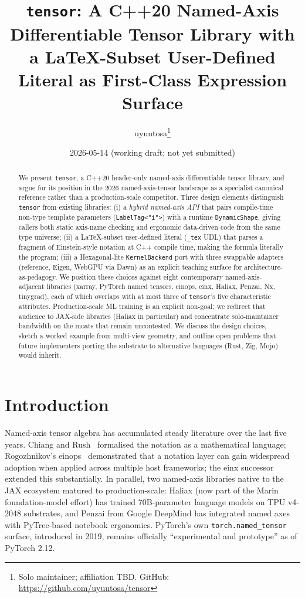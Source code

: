 \documentclass[11pt,a4paper]{article}
\title{\texttt{tensor}: A C++20 Named-Axis Differentiable
  Tensor Library with a \LaTeX-Subset User-Defined Literal as
  First-Class Expression Surface}
\author{%
  uyuutosa\thanks{Solo maintainer; affiliation TBD. GitHub:
    \url{https://github.com/uyuutosa/tensor}}%
}
\date{2026-05-14 (working draft; not yet submitted)}
\begin{document}
\maketitle

\begin{abstract}
We present \texttt{tensor}, a C++20 header-only named-axis
differentiable tensor library, and argue for its position in the
2026 named-axis-tensor landscape as a specialist canonical
reference rather than a production-scale competitor. Three design
elements distinguish \texttt{tensor} from existing libraries:
(i) a \emph{hybrid named-axis API} that pairs compile-time
non-type template parameters (\texttt{LabelTag<"i">}) with a
runtime \texttt{DynamicShape}, giving callers both static
axis-name checking and ergonomic data-driven code from the same
type universe; (ii) a \LaTeX-subset user-defined literal
(\texttt{\_tex} UDL) that parses a fragment of Einstein-style
notation at C++ compile time, making the formula literally the
program; (iii) a Hexagonal-lite \texttt{KernelBackend} port with
three swappable adapters (reference, Eigen, WebGPU via Dawn) as
an explicit teaching surface for architecture-as-pedagogy. We
position these choices against eight contemporary
named-axis-adjacent libraries (xarray, PyTorch named tensors,
einops, einx, Haliax, Penzai, Nx, tinygrad), each of which
overlaps with at most three of \texttt{tensor}'s five
characteristic attributes. Production-scale ML training is an
explicit non-goal; we redirect that audience to JAX-side
libraries (Haliax in particular) and concentrate
solo-maintainer bandwidth on the moats that remain
uncontested. We discuss the design choices, sketch a worked
example from multi-view geometry, and outline open problems that
future implementers porting the substrate to alternative
languages (Rust, Zig, Mojo) would inherit.
\end{abstract}

\section{Introduction}
\label{sec:intro}

Named-axis tensor algebra has accumulated steady literature over
the last five years. Chiang and Rush~\cite{ChiangRush2021}
formalised the notation as a mathematical language; Rogozhnikov's
einops~\cite{einops2022} demonstrated that a notation layer can
gain widespread adoption when applied across multiple host
frameworks; the einx successor~\cite{einx2026} extended this
substantially. In parallel, two named-axis libraries native to
the JAX ecosystem matured to production-scale: Haliax (now part
of the Marin foundation-model effort) has trained 70B-parameter
language models on TPU v4-2048 substrates, and Penzai from Google
DeepMind has integrated named axes with PyTree-based notebook
ergonomics. PyTorch's own \texttt{torch.named\_tensor} surface,
introduced in 2019, remains officially
``experimental and prototype'' as of PyTorch 2.12.
\end{document}
